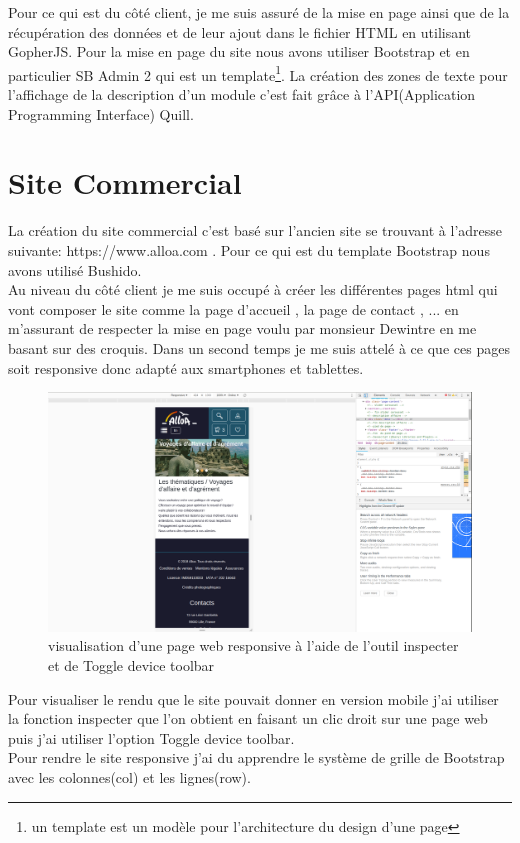 \documentclass[12pt,a4paper]{report}
\begin{document}
Pour ce qui est du côté client, je me suis assuré de la mise en page ainsi que de la  récupération des données et de leur ajout dans le fichier HTML en utilisant GopherJS. Pour la mise en page du site nous avons utiliser Bootstrap et en particulier SB Admin 2 qui est un template\footnote{un template est un modèle pour l'architecture du design d'une page }. La création des zones de texte pour l'affichage de la description d'un module c'est fait grâce à l'API(Application Programming Interface) Quill.

\section{Site Commercial}

La création du site commercial c'est basé sur l'ancien site  se trouvant à l'adresse suivante: https://www.alloa.com . Pour ce qui est du template Bootstrap nous avons utilisé Bushido. \\

Au niveau du côté client je me suis occupé à créer les différentes pages html qui vont composer le site comme la page d'accueil , la page de contact , ... en m'assurant de respecter la mise en page voulu par monsieur Dewintre en me basant sur des croquis. Dans un second temps je me suis attelé à ce que ces pages soit responsive donc adapté aux smartphones et tablettes.\\

\begin{figure}[!h]
\centerline{\includegraphics[scale=0.3]{responsive.png}}
\caption{visualisation d'une page web responsive à l'aide de l'outil inspecter et de Toggle device toolbar}
\label{image_hyooper}
\end{figure}

Pour visualiser le rendu que le site pouvait donner en version mobile j'ai utiliser la fonction inspecter que l'on obtient en faisant un clic droit sur une page web puis j'ai utiliser l'option Toggle device toolbar.\\

Pour rendre le site responsive j'ai du apprendre le système de grille de Bootstrap avec les colonnes(col) et les lignes(row).
\end{document}
